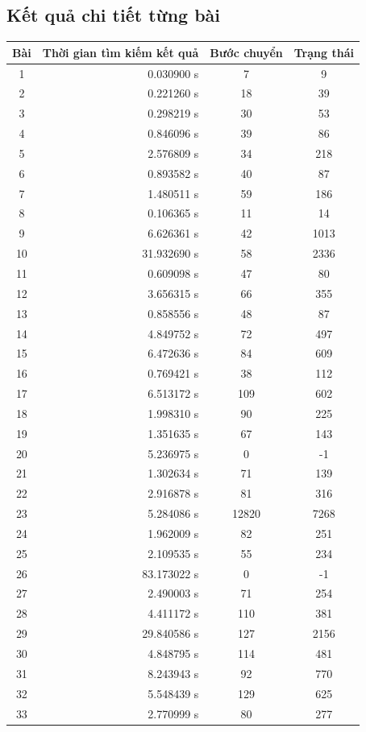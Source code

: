 \documentclass[a4paper]{article}
\begin{document}
\subsection{Kết quả chi tiết từng bài}
\begin{center}
	\begin{tabular}{|c|r|c|c|}
		\hline
		Bài & Thời gian tìm kiếm kết quả & Bước chuyển & Trạng thái \\ \hline
		1   & 0.030900 s	& 7		& 9 \\ \hline
		2   & 0.221260 s	& 18	& 39 \\ \hline
		3	& 0.298219 s	& 30	& 53 \\ \hline
		4 	& 0.846096 s	& 39	& 86 \\ \hline
		5	& 2.576809 s	& 34	& 218 \\ \hline
		6	& 0.893582 s	& 40	& 87 \\ \hline
		7	& 1.480511 s	& 59	& 186 \\ \hline
		8	& 0.106365 s	& 11	& 14 \\ \hline
		9	& 6.626361 s	& 42	& 1013 \\ \hline
		10	& 31.932690 s	& 58	& 2336 \\ \hline
		11	& 0.609098 s	& 47	& 80 \\ \hline
		12	& 3.656315 s	& 66	& 355 \\ \hline
		13	& 0.858556 s	& 48	& 87 \\ \hline
		14	& 4.849752 s	& 72	& 497 \\ \hline
		15	& 6.472636 s	& 84	& 609 \\ \hline
		16	& 0.769421 s	& 38	& 112 \\ \hline
		17	& 6.513172 s	& 109	& 602 \\ \hline
		18	& 1.998310 s	& 90	& 225 \\ \hline
		19	& 1.351635 s	& 67	& 143 \\ \hline
		20	& 5.236975 s	& 0		& -1  \\ \hline
		21	& 1.302634 s	& 71	& 139 \\ \hline
		22	& 2.916878 s	& 81	& 316 \\ \hline
		23	& 5.284086 s	& 12820	& 7268 \\ \hline
		24	& 1.962009 s	& 82	& 251 \\ \hline
		25	& 2.109535 s	& 55	& 234 \\ \hline
		26	& 83.173022 s	& 0		& -1 \\ \hline
		27	& 2.490003 s	& 71	& 254 \\ \hline
		28	& 4.411172 s	& 110	& 381 \\ \hline
		29	& 29.840586 s	& 127	& 2156 \\ \hline
		30	& 4.848795 s	& 114	& 481 \\ \hline
		31	& 8.243943 s	& 92	& 770 \\ \hline
		32	& 5.548439 s	& 129	& 625 \\ \hline
		33	& 2.770999 s	& 80	& 277 \\ \hline
	\end{tabular}	
\end{center}
\newpage
\end{document}
